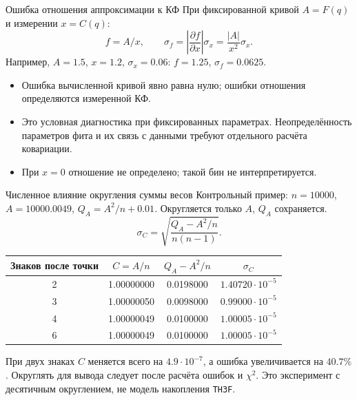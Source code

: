 \begin{frame}{Ошибка отношения аппроксимации к КФ}
    При фиксированной кривой $A=F(q)$ и измерении $x=C(q)$:
    \[
        f=A/x,\qquad \sigma_f=\left|\frac{\partial f}{\partial x}\right|\sigma_x
        =\frac{|A|}{x^2}\sigma_x.
    \]
    Например, $A=1.5$, $x=1.2$, $\sigma_x=0.06$:
    $f=1.25$, $\sigma_f=0.0625$.
    \begin{itemize}
        \item Ошибка вычисленной кривой явно равна нулю;
              ошибки отношения определяются измеренной КФ.
        \item Это условная диагностика при фиксированных параметрах.
              Неопределённость параметров фита и их связь с данными
              требуют отдельного расчёта ковариации.
        \item При $x=0$ отношение не определено; такой бин не интерпретируется.
    \end{itemize}
\end{frame}

\begin{frame}{Численное влияние округления суммы весов}
    \small
    Контрольный пример: $n=10000$, $A=10000.0049$,
    $Q_A=A^2/n+0.01$. Округляется только $A$, $Q_A$ сохраняется.
    \[
        \sigma_C=\sqrt{\frac{Q_A-A^2/n}{n(n-1)}}.
    \]
    \begin{center}
        \begin{tabular}{c|c|c|c}
            Знаков после точки & $C=A/n$ & $Q_A-A^2/n$ & $\sigma_C$\\ \hline
            2 & 1.00000000 & 0.0198000 & $1.40720\cdot10^{-5}$\\
            3 & 1.00000050 & 0.0098000 & $0.99000\cdot10^{-5}$\\
            4 & 1.00000049 & 0.0100000 & $1.00005\cdot10^{-5}$\\
            6 & 1.00000049 & 0.0100000 & $1.00005\cdot10^{-5}$
        \end{tabular}
    \end{center}
    При двух знаках $C$ меняется всего на $4.9\cdot10^{-7}$,
    а ошибка увеличивается на $40.7\%$.
    Округлять для вывода следует после расчёта ошибок и $\chi^2$.
    Это эксперимент с десятичным округлением, не модель накопления \texttt{TH3F}.
\end{frame}

